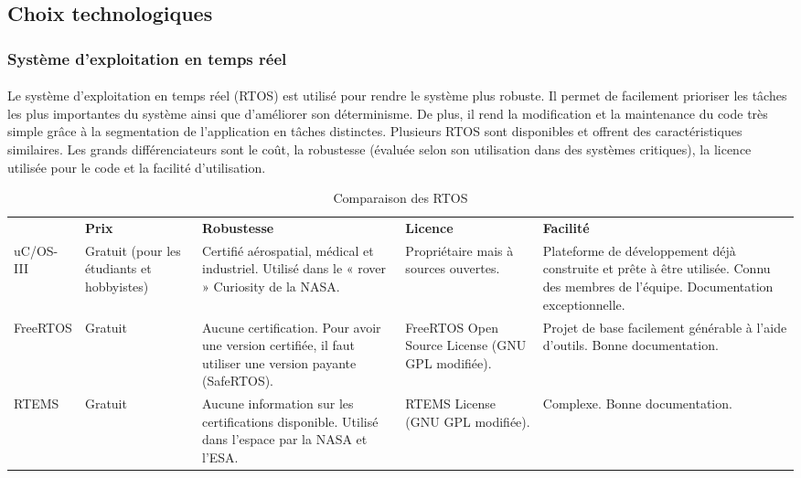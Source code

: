 \subsection{Choix technologiques}
	\subsubsection{Système d'exploitation en temps réel}
		\paragraph*{}
		Le système d’exploitation en temps réel (RTOS) est utilisé pour rendre le système plus robuste. Il permet de facilement prioriser les tâches les plus importantes du système ainsi que d’améliorer son déterminisme. De plus, il rend la modification et la maintenance du code très simple grâce à la segmentation de l’application en tâches distinctes. Plusieurs RTOS sont disponibles et offrent des caractéristiques similaires. Les grands différenciateurs sont le coût, la robustesse (évaluée selon son utilisation dans des systèmes critiques), la licence utilisée pour le code et la facilité d’utilisation.

		\begin{table}[H]
			\centering
			\caption{Comparaison des RTOS}
			\label{my-label}
			\begin{tabular}{|p{3cm}|p{3cm}|p{3cm}|p{3cm}|p{3cm}|}
				\hline &
				\textbf{Prix} & \textbf{Robustesse} & \textbf{Licence} & \textbf{Facilité}
				\\ \hhline{|=|=|=|=|=|}
				uC/OS-III &
				Gratuit (pour les étudiants et hobbyistes) &
				Certifié aérospatial, médical et industriel.
				Utilisé dans le « rover » Curiosity de la NASA. &
				Propriétaire mais à sources ouvertes. &
				Plateforme de développement déjà construite et prête à être utilisée.
				Connu des membres de l’équipe.
				Documentation exceptionnelle.
				\\ \hline
				FreeRTOS &
				Gratuit &
				Aucune certification. Pour avoir une version certifiée, il faut utiliser une version payante (SafeRTOS). &
				FreeRTOS Open Source License (GNU GPL modifiée). &
				Projet de base facilement générable à l’aide d’outils.
				Bonne documentation.
				\\ \hline
				RTEMS &
				Gratuit &
				Aucune information sur les certifications disponible.
				Utilisé dans l’espace par la NASA et l’ESA. &
				RTEMS License (GNU GPL modifiée). &
				Complexe.
				Bonne documentation.                                                                              \\ \hline
			\end{tabular}
		\end{table}

